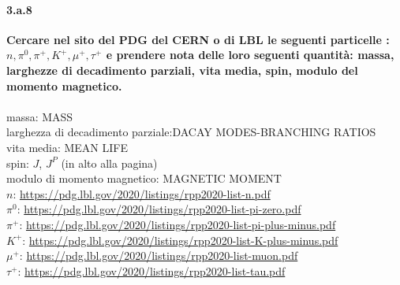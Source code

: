 \documentclass[twoside]{article}
\begin{document}
\paragraph{3.a.8}\textbf{Cercare nel sito del PDG del CERN o di LBL le seguenti particelle : $n,\pi^0,\pi^+,K^+,\mu^+,\tau^+$ e prendere nota delle loro seguenti quantità: massa, larghezze di
decadimento parziali, vita media, spin, modulo del momento magnetico.}\\ \\
massa: MASS\\
larghezza di decadimento parziale:DACAY MODES-BRANCHING RATIOS\\
vita media: MEAN LIFE  \\
spin: $J$, $J^{P}$ (in alto alla pagina)\\
modulo di momento magnetico: MAGNETIC MOMENT\\




$n$: \url{https://pdg.lbl.gov/2020/listings/rpp2020-list-n.pdf}\\
$\pi^0$: \url{https://pdg.lbl.gov/2020/listings/rpp2020-list-pi-zero.pdf}\\
$\pi^+$: \url{https://pdg.lbl.gov/2020/listings/rpp2020-list-pi-plus-minus.pdf}\\
$K^+$: \url{https://pdg.lbl.gov/2020/listings/rpp2020-list-K-plus-minus.pdf}\\
$\mu^+$: \url{https://pdg.lbl.gov/2020/listings/rpp2020-list-muon.pdf}\\
$\tau^+$: \url{https://pdg.lbl.gov/2020/listings/rpp2020-list-tau.pdf}\\
\end{document}
